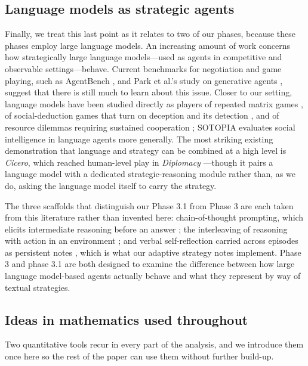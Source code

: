 \documentclass[10pt,twocolumn,letterpaper]{article}
\begin{document}
\subsection{Language models as strategic agents}
Finally, we treat this last point as it relates to two of our phases,
because these phases employ large language models. An increasing
amount of work concerns how strategically large language
models---used as agents in competitive and observable
settings---behave. Current benchmarks for negotiation and game
playing, such as AgentBench \citep{liu2024agentbench}, and Park et
al.'s study on generative agents \citep{park2023generative}, suggest
that there is still much to learn about this issue. Closer to our
setting, language models have been studied directly as players of
repeated matrix games \citep{akata2023playing}, of social-deduction
games that turn on deception and its detection
\citep{xu2023exploring}, and of resource dilemmas requiring
sustained cooperation \citep{piatti2024cooperate}; SOTOPIA
\citep{zhou2024sotopia} evaluates social intelligence in language
agents more generally. The most striking existing demonstration
that language and strategy can be combined at a high level is
\emph{Cicero}, which reached human-level play in \emph{Diplomacy}
\citep{bakhtin2022human}---though it pairs a language model with a
dedicated strategic-reasoning module rather than, as we do, asking
the language model itself to carry the strategy.

The three scaffolds that distinguish our Phase 3.1 from Phase 3 are
each taken from this literature rather than invented here:
chain-of-thought prompting, which elicits intermediate reasoning
before an answer \citep{wei2022chain}; the interleaving of reasoning
with action in an environment \citep{yao2023react}; and verbal
self-reflection carried across episodes as persistent notes
\citep{shinn2023reflexion}, which is what our adaptive strategy
notes implement. Phase 3 and
phase 3.1 are both designed to examine the difference between how
large language model-based agents actually behave and what they
represent by way of textual strategies.

\subsection{Ideas in mathematics used throughout}
Two quantitative tools recur in every part of the analysis, and we
introduce them once here so the rest of the paper can use them
without further build-up.
\end{document}
